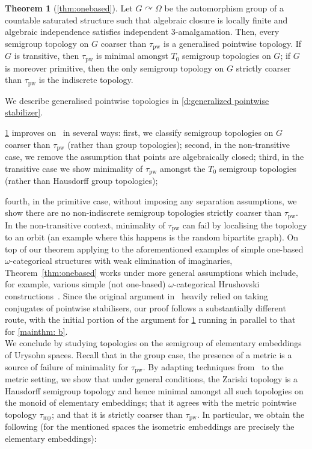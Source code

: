 \documentclass{article}
\theoremstyle{remark}
\theoremstyle{definition}
\newtheorem{thmx}{Theorem}
\def\acts{\curvearrowright}
\newcommand{\pw}[0]{\tau_{\mathrm{pw}}}
\newcommand{\mpw}[0]{\tau_{\mathrm{mp}}}
\begin{document}
\begin{thmx}[\cref{thm:onebased}] \label{mainthm: c} 
Let $G\acts\Omega$ be the automorphism group of a countable saturated structure such that algebraic closure is  locally finite
and { algebraic independence} satisfies independent $3$-amalgamation.
Then, every semigroup topology on $G$ coarser than $\pw$ is a generalised pointwise topology. If $G$ is transitive, then $\pw$ is minimal amongst {$T_0$} semigroup topologies on $G$; if $G$ is moreover primitive, then {the only semigroup topology on $G$ strictly coarser than $\pw$ is the indiscrete topology.}
\end{thmx}
We describe generalised pointwise topologies in \cref{d:generalized pointwise stabilizer}. {\cref{mainthm: c} improves on~\cite[Theorem B]{ghaddln24} in several ways: first, we classify semigroup topologies on $G$ coarser than $\pw$ (rather than group topologies); second, in the non-transitive case, we remove the assumption that points are algebraically closed; third, in the 
transitive case we show minimality of $\pw$ amongst the {$T_0$} semigroup topologies (rather than Hausdorff group topologies); {fourth, in the primitive case, {without imposing any separation assumptions, we show there are no non-indiscrete semigroup topologies strictly coarser than $\pw$.}\\







In the non-transitive context, minimality of $\pw$ can fail by localising the topology to an orbit (an example where this happens is  the random bipartite graph). On top of our theorem applying to the aforementioned examples of simple one-based $\omega$-categorical structures with weak elimination of imaginaries, Theorem~\ref{thm:onebased} works under more general assumptions which include, for example, various simple (not one-based) $\omega$-categorical Hrushovski constructions~\cite{Wagner:ST,ghaddln24}. Since the original argument in~\cite{ghaddln24} heavily relied on taking conjugates of pointwise stabilisers, our proof follows a substantially different route, with the initial portion of the argument for \cref{mainthm: c} running in parallel to that for \cref{mainthm: b}.\\

We conclude by studying topologies on the semigroup of elementary embeddings of Ury\-sohn spaces. Recall that in the group case, the presence of a metric is a source of failure of  minimality for $\pw$. 
By adapting techniques from~\cite{pinskerschindler} to the metric setting, we show that under general conditions, the Zariski topology is a Hausdorff semigroup topology and hence minimal amongst  all such topologies on the monoid of elementary embeddings; that it agrees with the metric pointwise topology $\mpw$; and that it is strictly coarser than $\pw$. In particular, we obtain the following (for the mentioned spaces the isometric embeddings are precisely the elementary embeddings):

}}
\end{document}
